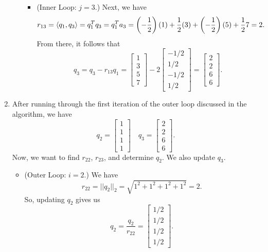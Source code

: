 \documentclass[letterpaper]{article}
\begin{document}
\begin{mdframed}
\begin{enumerate}
\begin{itemize}
\begin{itemize}
                \item (Inner Loop: $j = 3$.) Next, we have 
                \[r_{13} = \langle q_1, q_3 \rangle = q_1^T q_3 = q_1^T a_3 = \left(-\frac{1}{2}\right)(1) + \frac{1}{2}(3) + \left(-\frac{1}{2}\right)(5) + \frac{1}{2}7 = 2.\]
                From there, it follows that 
                \[q_3 = q_3 - r_{13}q_1 = \begin{bmatrix}
                    1\\3\\5\\7
                \end{bmatrix} - 2\begin{bmatrix}
                    -1/2 \\ 1/2 \\ -1/2 \\ 1/2
                \end{bmatrix} = \begin{bmatrix}
                    2 \\ 2 \\ 6 \\ 6
                \end{bmatrix}.\]
            \end{itemize}
        \end{itemize}
        
        \item After running through the first iteration of the outer loop discussed in the algorithm, we have 
        \[q_2 = \begin{bmatrix}
            1\\1\\1\\1
        \end{bmatrix} \quad q_3 = \begin{bmatrix}
            2\\2\\6\\6
        \end{bmatrix}.\] 
        Now, we want to find $r_{22}$, $r_{23}$, and determine $q_2$. We also update $q_3$. 
        \begin{itemize}
            \item (Outer Loop: $i = 2$.) We have 
            \[r_{22} = ||q_2||_2 = \sqrt{1^2 + 1^2 + 1^2 + 1^2} = 2.\]
            So, updating $q_2$ gives us 
            \[q_2 = \frac{q_2}{r_{22}} = \begin{bmatrix}
                1/2 \\ 1/2 \\ 1/2 \\ 1/2
            \end{bmatrix}.\] 


\end{itemize}
\end{enumerate}
\end{mdframed}
\end{document}
